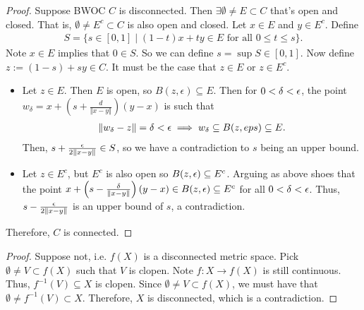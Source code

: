 \documentclass{report}
\begin{document}
\begin{proof}
    Suppose BWOC $C$ is disconnected. Then $ \exists \emptyset \neq E \subset C$ that's open and closed. That is, $\emptyset \neq E^c \subset C$ is also open and closed. Let $x \in E$ and $y \in E^c$. Define 
    \begin{align*}
        S = \{s \in [0, 1] \mid (1-t)x + ty \in E \text{ for all $0 \leq t \leq s$}\}.
    \end{align*}
    Note $x \in E$ implies that $0 \in S$. So we can define $s = \sup S \in [0, 1]$. Now define $z := (1-s) + sy \in C$. It must be the case that $z \in E$ or $z \in E^c$.
    \begin{itemize}
        \item Let $z \in E$. Then $E$ is open, so $B(z, \epsilon) \subseteq E$. Then for $0 < \delta < \epsilon$, the point $w_\delta = x + \left(s + \frac{d}{\Vert x- y \Vert}\right) (y-x)$ is such that 
        \begin{align*}
            \Vert w_\delta - z \Vert = \delta  <\epsilon \implies w_\delta \subseteq B(z, eps) \subseteq E.
        \end{align*}
        Then, $s + \frac{\epsilon}{2\Vert x- y \Vert} \in S$, so we have a contradiction to $s$ being an upper bound.
        \item Let $z \in E^c$, but $E^c$ is also open so $B(z, \epsilon) \subseteq E^c$. Arguing as above shoes that the point $x + \left(s - \frac{\delta}{\Vert x- y\Vert}\right)(y-x) \in B(z, \epsilon) \subseteq E^c$ for all $0 < \delta< \epsilon$. Thus, $s - \frac{\epsilon}{2 \Vert x-y\Vert}$ is an upper bound of $s$, a contradiction.
    \end{itemize}
    Therefore, $C$ is connected.
\end{proof}

\begin{proof}
    Suppose not, i.e. $f(X)$ is a disconnected metric space. Pick $\emptyset \neq V \subset f(X)$ such that $V$ is clopen. Note $f: X \to f(X)$ is still continuous. Thus, $f^{-1}(V) \subseteq X$ is clopen. Since $\emptyset \neq V \subset f(X)$, we must have that $\emptyset \neq f^{-1}(V) \subset X$. Therefore, $X$ is disconnected, which is a contradiction.
\end{proof}

\end{document}
